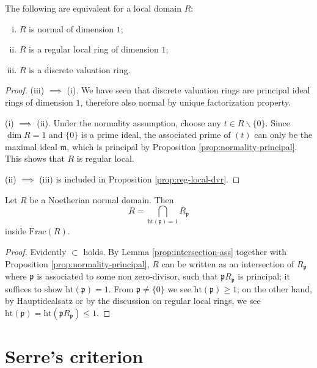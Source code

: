 \begin{corollary}\label{prop:normality-dvr}
	The following are equivalent for a local domain $R$:
	\begin{enumerate}[(i)]
		\item $R$ is normal of dimension $1$;
		\item $R$ is a regular local ring of dimension $1$;
		\item $R$ is a discrete valuation ring.
	\end{enumerate}
\end{corollary}
\begin{proof}
	(iii) $\implies$ (i). We have seen that discrete valuation rings are principal ideal rings of dimension $1$, therefore also normal by unique factorization property.
	
	(i) $\implies$ (ii). Under the normality assumption, choose any $t \in R \smallsetminus \{0\}$. Since $\dim R = 1$ and $\{0\}$ is a prime ideal, the associated prime of $(t)$ can only be the maximal ideal $\mathfrak{m}$, which is principal by Proposition \ref{prop:normality-principal}. This shows that $R$ is regular local.
	
	(ii) $\implies$ (iii) is included in Proposition \ref{prop:reg-local-dvr}.
\end{proof}

\begin{corollary}
	Let $R$ be a Noetherian normal domain. Then
	\[ R = \bigcap_{\mathrm{ht}(\mathfrak{p}) = 1} R_{\mathfrak{p}} \]
	inside $\mathrm{Frac}(R)$.
\end{corollary}
\begin{proof}
	Evidently $\subset$ holds. By Lemma \ref{prop:intersection-ass} together with Proposition \ref{prop:normality-principal}, $R$ can be written as an intersection of $R_{\mathfrak{p}}$ where $\mathfrak{p}$ is associated to some non zero-divisor, such that $\mathfrak{p}R_{\mathfrak{p}}$ is principal; it suffices to show $\text{ht}(\mathfrak{p})=1$. From $\mathfrak{p} \neq \{0\}$ we see $\text{ht}(\mathfrak{p}) \geq 1$; on the other hand, by Hauptidealsatz or by the discussion on regular local rings, we see $\text{ht}(\mathfrak{p}) = \text{ht}(\mathfrak{p}R_{\mathfrak{p}}) \leq 1$.
\end{proof}

\section{Serre's criterion}

